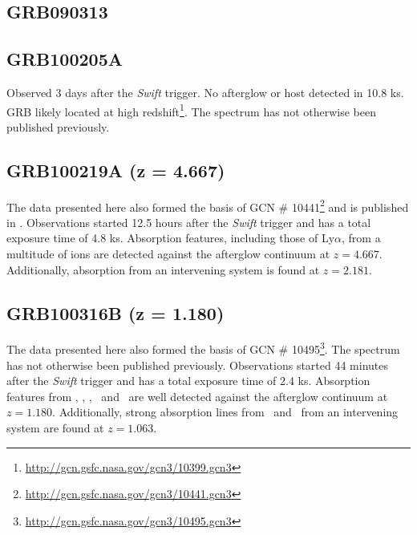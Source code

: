 \documentclass[iop, twocolappendix, numberedappendix, tighten, appendixfloats]{emulateapj}
\newcommand{\lya}{Ly$\alpha$}
\newcommand{\feii}{\ion{Fe}{2}}
\newcommand{\mgi}{\ion{Mg}{1}}
\newcommand{\mgii}{\ion{Mg}{2}}
\newcommand{\alii}{\ion{Al}{2}}
\newcommand{\aliii}{\ion{Al}{3}}
\begin{document}
	\subsection{GRB090313}
	
	\subsection{GRB100205A}
	Observed 3 days after the \textit{Swift} trigger. No afterglow or host detected
	in 10.8 ks. GRB likely located at high
	redshift\footnote{\url{http://gcn.gsfc.nasa.gov/gcn3/10399.gcn3}}. The spectrum
	has not otherwise been published previously.
	
	\subsection{GRB100219A (z = 4.667)}
	The data presented here also formed the basis of GCN \#
	10441\footnote{\url{http://gcn.gsfc.nasa.gov/gcn3/10441.gcn3}} and is published
	in \citet{Thone2013}. Observations started 12.5 hours after the \textit{Swift}
	trigger and has a total exposure time of 4.8 ks. Absorption features, including
	those of \lya, from a multitude of ions are detected against the afterglow
	continuum at $z = 4.667$. Additionally, absorption from an intervening system
	is found at $z = 2.181$.
	
	\subsection{GRB100316B (z = 1.180)}
	The data presented here also formed the basis of GCN \#
	10495\footnote{\url{http://gcn.gsfc.nasa.gov/gcn3/10495.gcn3}}. The spectrum
	has not otherwise been published previously. Observations started 44 minutes
	after the \textit{Swift} trigger and has a total exposure time of 2.4 ks.
	Absorption features from \feii, \alii, \aliii,	\mgii~and \mgi~are well detected
	against the afterglow continuum at $z = 1.180$. Additionally, strong absorption
	lines from \feii~and \mgii~from an intervening system are found at $z = 1.063$.
	
\end{document}
